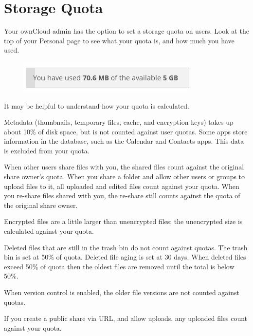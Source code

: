 \documentclass[letterpaper,10pt,english]{sphinxmanual}
\begin{document}
\section{Storage Quota}
\label{files/quota:storage-quota}\label{files/quota::doc}
Your ownCloud admin has the option to set a storage quota on users. Look at
the top of your Personal page to see what your quota is, and how much you have
used.
\begin{figure}[htbp]
\centering

\includegraphics{quota1.png}
\end{figure}

It may be helpful to understand how your quota is calculated.

Metadata (thumbnails, temporary files, cache, and encryption keys) takes up
about 10\% of disk space, but is not counted against user quotas. Some apps
store information in the database, such as the Calendar and Contacts apps. This
data is excluded from your quota.

When other users share files with you, the shared files count against the
original share owner's quota. When you share a folder and allow other users or
groups to upload files to it, all uploaded and edited files count against your
quota. When you re-share files shared with you, the re-share still counts
against the quota of the original share owner.

Encrypted files are a little larger than unencrypted files; the unencrypted size
is calculated against your quota.

Deleted files that are still in the trash bin do not count against quotas. The
trash bin is set at 50\% of quota. Deleted file aging is set at 30 days. When
deleted files exceed 50\% of quota then the oldest files are removed until the
total is below 50\%.

When version control is enabled, the older file versions are not counted against
quotas.

If you create a public share via URL, and allow uploads, any uploaded files
count against your quota.
\end{document}
